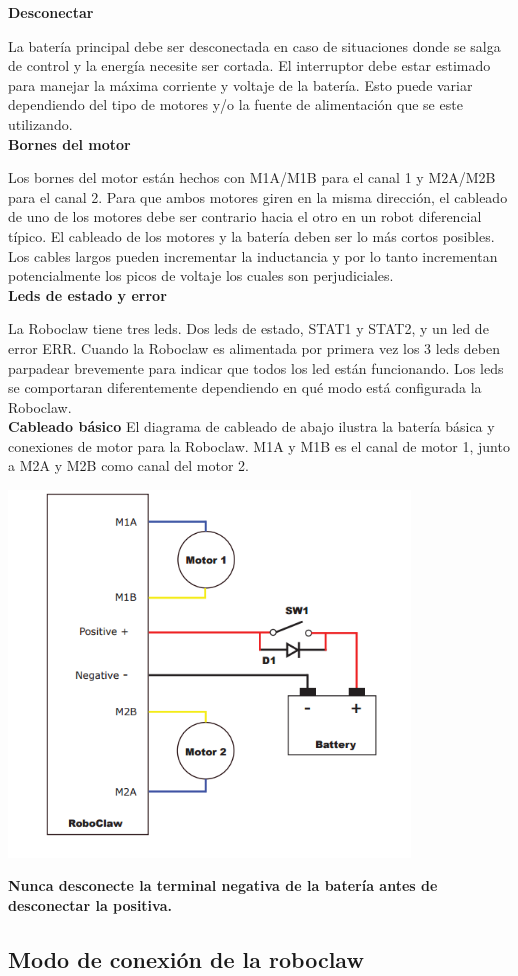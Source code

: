 \documentclass[user_manual.tex]{subfiles}
\begin{document}
\textbf{Desconectar}

La batería principal debe ser desconectada en caso de situaciones donde se salga de control y la energía necesite ser
cortada. El interruptor debe estar estimado para manejar la máxima corriente y voltaje de la batería. Esto puede variar
dependiendo del tipo de motores y/o la fuente de alimentación que se este utilizando.\\

\textbf{Bornes del motor}

Los bornes del motor están hechos con M1A/M1B para el canal 1 y M2A/M2B para el canal 2. Para que ambos motores giren en
la misma dirección, el cableado de uno de los motores debe ser contrario hacia el otro en un robot diferencial típico. El
cableado de los motores y la batería deben ser lo más cortos posibles. Los cables largos pueden incrementar la inductancia
y por lo tanto incrementan potencialmente los picos de voltaje los cuales son perjudiciales.\\

\textbf{Leds de estado y error}

La Roboclaw tiene tres leds. Dos leds de estado, STAT1 y STAT2, y un led de error ERR. Cuando la Roboclaw es alimentada por primera vez los 3 leds deben parpadear brevemente para indicar que todos los led están funcionando. Los leds se
comportaran diferentemente dependiendo en qué modo está configurada la Roboclaw.\\

\textbf{Cableado básico}
El diagrama de cableado de abajo ilustra la batería básica y conexiones de motor para la Roboclaw. M1A y M1B es el canal
de motor 1, junto a M2A y M2B como canal del motor 2.\\

\begin{center}
\includegraphics[width=0.8\textwidth]{Figures/Hardware/Partes/Motores.png}
\label{fig:Hardware:Partes:Motores}
\end{center}

\textbf{Nunca desconecte la terminal negativa de la batería antes de desconectar la positiva.}\\


\subsection{Modo de conexión de la roboclaw}




 
\end{document}
